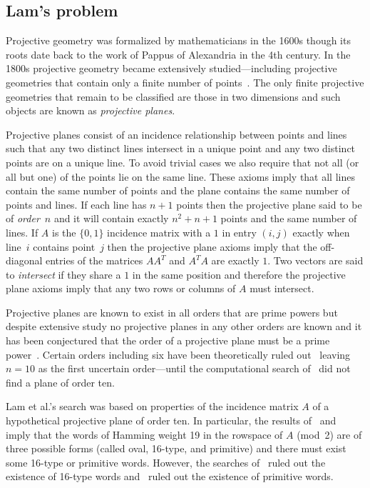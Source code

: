 \documentclass[letterpaper]{article}
\begin{document}
\subsection{Lam's problem}

Projective geometry was formalized by mathematicians in the 1600s though its roots
date back to the work of Pappus of Alexandria in the 4th century.  In the 1800s
projective geometry became extensively studied---including projective geometries
that contain only a finite number of points~\cite{von1856beitrage}.
The only finite projective geometries that remain to be classified are those
in two dimensions and such objects are known as \emph{projective planes}.

Projective planes consist of an incidence relationship
between points and lines such that any two distinct lines intersect in a unique
point and any two distinct points are on a unique line.  To avoid
trivial cases we also require that not all (or all but one) of the points lie
on the same line.  These axioms imply that all lines contain the same number
of points and the plane contains the same number of points and lines.
If each line has $n+1$ points then the projective plane said to be of \emph{order}~$n$
and it will contain exactly $n^2+n+1$ points and the same number of lines.
If $A$ is the $\{0,1\}$ incidence matrix with a $1$ in entry $(i,j)$ exactly
when line~$i$ contains point~$j$
then the projective plane axioms imply that the off-diagonal entries of
the matrices $AA^T$ and $A^TA$ are exactly $1$.  Two vectors are said to
\emph{intersect} if they share a $1$ in the same position and therefore
the projective plane axioms imply that any two rows or columns of $A$ must intersect.

Projective planes are known to exist in all orders that are prime powers
but despite extensive study no projective planes in any other orders
are known and it has been conjectured that the order of a projective plane
must be a prime power~\cite{weisstein2002crc}.  Certain orders including six have
been theoretically ruled out~\cite{bruck1949nonexistence} leaving $n=10$ as the first uncertain
order---until the computational search of~\cite{lam1989non} did not find a plane
of order ten.

Lam et al.'s search was based on properties
of the incidence matrix $A$ of a hypothetical projective plane of order ten.
In particular, the results of~\cite{carter1974existence} and~\cite{macwilliams1973existence}
imply that the words of Hamming weight 19 in the rowspace of $A$ (mod~2)
are of three possible forms (called oval, 16-type, and primitive) and there must exist some
16-type or primitive words.  However, the searches
of~\cite{lam1986nonexistence}
ruled out the existence of 16-type words and~\cite{lam1989non} ruled out
the existence of primitive words.
\end{document}

